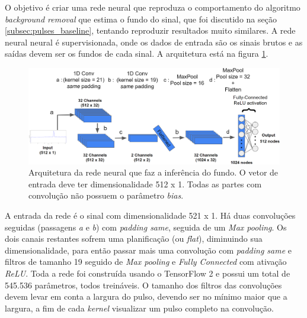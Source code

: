 \documentclass[a4paper,12pt,oneside]{book}
\begin{document}
\par O objetivo é criar uma rede neural que reproduza o comportamento do algoritmo \textit{background removal} que estima o fundo do sinal, que foi discutido na seção \ref{subsec:pulses_baseline}, tentando reproduzir resultados muito similares. A rede neural neural é supervisionada, onde os dados de entrada são os sinais brutos e as saídas devem ser os fundos de cada sinal. A arquitetura está na figura \ref{fig:arq_source_to_bkg}.



\begin{figure}[H]
    \centering
    \includegraphics[scale = 0.28]{figs/Source to only bkg.png}
    \caption{Arquitetura da rede neural que faz a inferência do fundo. O vetor de entrada deve ter dimensionalidade 512 x 1. Todas as partes com convolução não possuem o parâmetro \textit{bias}.}
    \label{fig:arq_source_to_bkg}
\end{figure}

\par A entrada da rede é o sinal com dimensionalidade 521 x 1. Há duas convoluções seguidas (passagens \textit{a} e \textit{b}) com \textit{padding same}, seguida de um \textit{Max pooling}. Os dois canais restantes sofrem uma planificação (ou \textit{flat}), diminuindo sua dimensionalidade, para então passar mais uma convolução com \textit{padding same} e filtros de tamanho 19 seguido de \textit{Max pooling} e \textit{Fully Connected} com ativação \textit{ReLU}. Toda a rede foi construída usando o TensorFlow 2 e possui um total de 545.536 parâmetros, todos treináveis. O tamanho dos filtros das convoluções devem levar em conta a largura do pulso, devendo ser no mínimo maior que a largura, a fim de cada \textit{kernel} visualizar um pulso completo na convolução.
\end{document}
